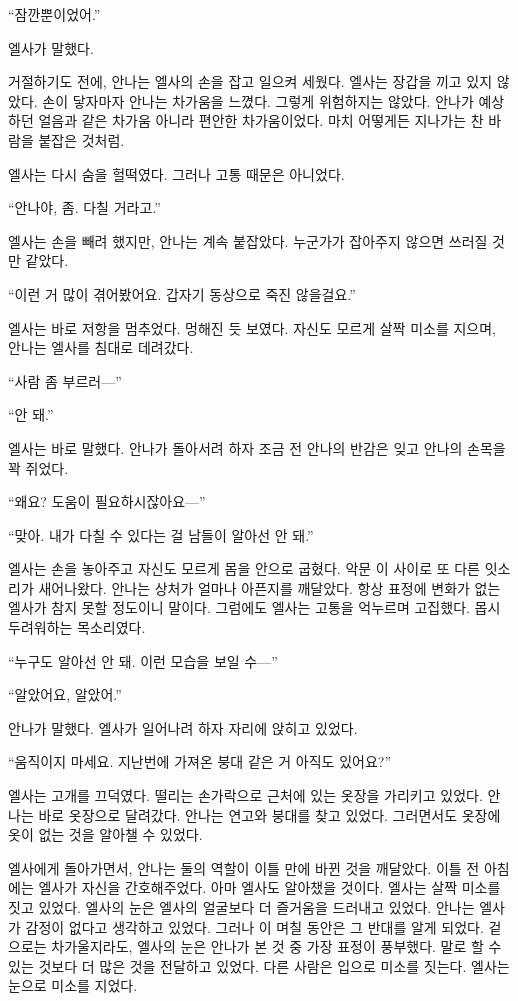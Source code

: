 ``잠깐뿐이었어.''

엘사가 말했다.

거절하기도 전에, 안나는 엘사의 손을 잡고 일으켜 세웠다. 엘사는 장갑을 끼고 있지 않았다. 손이 닿자마자 안나는 차가움을 느꼈다. 그렇게 위험하지는 않았다. 안나가 예상하던 얼음과 같은 차가움 아니라 편안한 차가움이었다. 마치 어떻게든 지나가는 찬 바람을 붙잡은 것처럼.

엘사는 다시 숨을 헐떡였다. 그러나 고통 때문은 아니었다.

``안나야, 좀. 다칠 거라고.''

엘사는 손을 빼려 했지만, 안나는 계속 붙잡았다. 누군가가 잡아주지 않으면 쓰러질 것만 같았다.

``이런 거 많이 겪어봤어요. 갑자기 동상으로 죽진 않을걸요.''

엘사는 바로 저항을 멈추었다. 멍해진 듯 보였다. 자신도 모르게 살짝 미소를 지으며, 안나는 엘사를 침대로 데려갔다.

``사람 좀 부르러—''

``안 돼.''

엘사는 바로 말했다. 안나가 돌아서려 하자 조금 전 안나의 반감은 잊고 안나의 손목을 꽉 쥐었다.

``왜요? 도움이 필요하시잖아요—''

``맞아. 내가 다칠 수 있다는 걸 남들이 알아선 안 돼.''

엘사는 손을 놓아주고 자신도 모르게 몸을 안으로 굽혔다. 악문 이 사이로 또 다른 잇소리가 새어나왔다. 안나는 상처가 얼마나 아픈지를 깨달았다. 항상 표정에 변화가 없는 엘사가 참지 못할 정도이니 말이다. 그럼에도 엘사는 고통을 억누르며 고집했다. 몹시 두려워하는 목소리였다.

``누구도 알아선 안 돼. 이런 모습을 보일 수—''

``알았어요, 알았어.''

안나가 말했다. 엘사가 일어나려 하자 자리에 앉히고 있었다.

``움직이지 마세요. 지난번에 가져온 붕대 같은 거 아직도 있어요?''

엘사는 고개를 끄덕였다. 떨리는 손가락으로 근처에 있는 옷장을 가리키고 있었다. 안나는 바로 옷장으로 달려갔다. 안나는 연고와 붕대를 찾고 있었다. 그러면서도 옷장에 옷이 없는 것을 알아챌 수 있었다.

엘사에게 돌아가면서, 안나는 둘의 역할이 이틀 만에 바뀐 것을 깨달았다. 이틀 전 아침에는 엘사가 자신을 간호해주었다. 아마 엘사도 알아챘을 것이다. 엘사는 살짝 미소를 짓고 있었다. 엘사의 눈은 엘사의 얼굴보다 더 즐거움을 드러내고 있었다. 안나는 엘사가 감정이 없다고 생각하고 있었다. 그러나 이 며칠 동안은 그 반대를 알게 되었다. 겉으로는 차가울지라도, 엘사의 눈은 안나가 본 것 중 가장 표정이 풍부했다. 말로 할 수 있는 것보다 더 많은 것을 전달하고 있었다. 다른 사람은 입으로 미소를 짓는다. 엘사는 눈으로 미소를 지었다.

